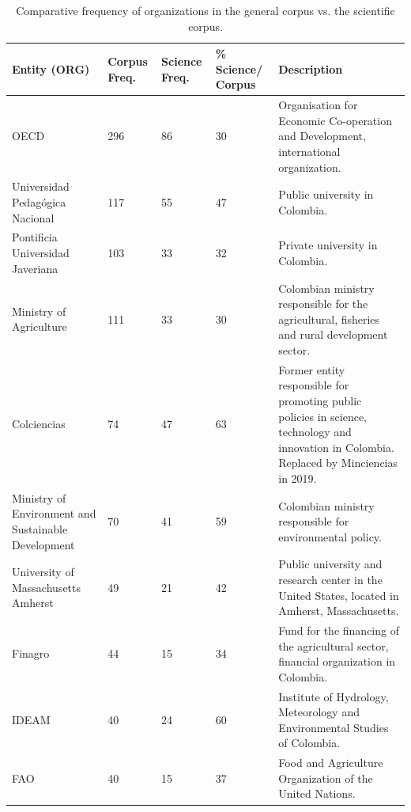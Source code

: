 \documentclass[11pt,a4paper]{article}
\begin{document}
	\begin{table}[H]
		\centering
		\caption{Comparative frequency of organizations in the general corpus vs. the scientific corpus.}
		\label{tab:ents_org}
		\footnotesize 
		
		\begin{tabular}{p{3cm}P{2.2cm}P{2.2cm}P{2.2cm}p{5cm}}
			\toprule
			\textbf{Entity (ORG)} & 
			\textbf{Corpus Freq.} & 
			\textbf{Science Freq.} & 
			\textbf{\% Science/ Corpus} & 
			\textbf{Description} \\
			\midrule
			OECD & 296 & 86 & 30 & Organisation for Economic Co-operation and Development, international organization. \\
			Universidad Pedagógica Nacional & 117 & 55 & 47 & Public university in Colombia. \\
			Pontificia Universidad Javeriana & 103 & 33 & 32 & Private university in Colombia. \\
			Ministry of Agriculture & 111 & 33 & 30 & Colombian ministry responsible for the agricultural, fisheries and rural development sector. \\
			Colciencias & 74 & 47 & 63 & Former entity responsible for promoting public policies in science, technology and innovation in Colombia. Replaced by Minciencias in 2019. \\
			Ministry of Environment and Sustainable Development & 70 & 41 & 59 & Colombian ministry responsible for environmental policy. \\
			University of Massachusetts Amherst & 49 & 21 & 42 & Public university and research center in the United States, located in Amherst, Massachusetts. \\
			Finagro & 44 & 15 & 34 & Fund for the financing of the agricultural sector, financial organization in Colombia. \\
			IDEAM & 40 & 24 & 60 & Institute of Hydrology, Meteorology and Environmental Studies of Colombia. \\
			FAO & 40 & 15 & 37 & Food and Agriculture Organization of the United Nations.\\
			
			\bottomrule
		\end{tabular}
	\end{table}
	
\end{document}
